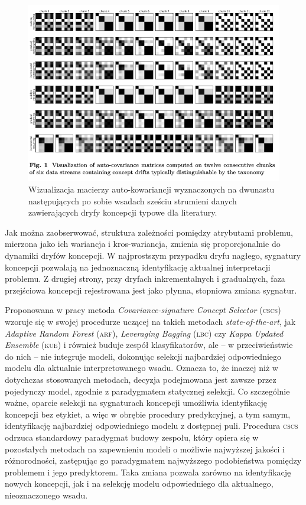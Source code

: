 \begin{figure}[h]
	\centering
	\includegraphics[width=1\textwidth, clip=true, trim=0 270 0 0]{figures/CS1}
	\caption{Wizualizacja macierzy auto-kowariancji wyznaczonych na dwunastu następujących po sobie wsadach sześciu strumieni danych zawierających dryfy koncepcji typowe dla literatury.}\label{fig:CS1}
\end{figure}

Jak można zaobserwować, struktura zależności pomiędzy atrybutami problemu, mierzona jako ich wariancja i kros-wariancja, zmienia się proporcjonalnie do dynamiki dryfów koncepcji. W najprostszym przypadku dryfu nagłego, sygnatury koncepcji pozwalają na jednoznaczną identyfikację aktualnej interpretacji problemu. Z drugiej strony, przy dryfach inkrementalnych i gradualnych, faza przejściowa koncepcji rejestrowana jest jako płynna, stopniowa zmiana sygnatur.

Proponowana w pracy metoda \emph{Covariance-signature Concept Selector} (\textsc{cscs}) wzoruje się w swojej procedurze uczącej na takich metodach \emph{state-of-the-art}, jak \emph{Adaptive Random Forest} (\textsc{arf}), \emph{Leveraging Bagging} (\textsc{lbc}) czy \emph{Kappa Updated Ensemble} (\textsc{kue}) i również buduje zespół klasyfikatorów, ale -- w przeciwieństwie do nich -- nie integruje modeli, dokonując selekcji najbardziej odpowiedniego modelu dla aktualnie interpretowanego wsadu. Oznacza to, że inaczej niż w dotychczas stosowanych metodach, decyzja podejmowana jest zawsze przez pojedynczy model, zgodnie z paradygmatem statycznej selekcji. Co szczególnie ważne, oparcie selekcji na sygnaturach koncepcji umożliwia identyfikację koncepcji bez etykiet, a więc w obrębie procedury predykcyjnej, a tym samym, identyfikację najbardziej odpowiedniego modelu z dostępnej puli. Procedura \textsc{cscs} odrzuca standardowy paradygmat budowy zespołu, który opiera się w pozostałych metodach na zapewnieniu modeli o możliwie najwyższej jakości i różnorodności, zastępując go paradygmatem najwyższego podobieństwa pomiędzy problemem i jego predyktorem. Taka zmiana pozwala zarówno na identyfikację nowych koncepcji, jak i na selekcję modelu odpowiedniego dla aktualnego, nieoznaczonego wsadu.

